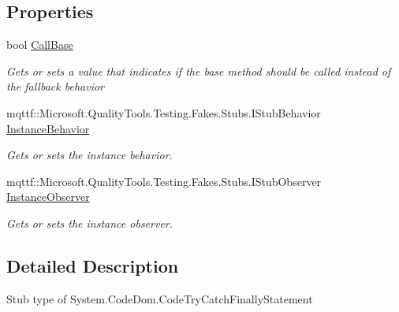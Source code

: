 \subsection*{Properties}
\begin{DoxyCompactItemize}
\item 
bool \hyperlink{class_system_1_1_code_dom_1_1_fakes_1_1_stub_code_try_catch_finally_statement_a00395c1c5a644d6f84ca9e58a2e447ac}{Call\-Base}
\begin{DoxyCompactList}\small\item\em Gets or sets a value that indicates if the base method should be called instead of the fallback behavior\end{DoxyCompactList}\item 
mqttf\-::\-Microsoft.\-Quality\-Tools.\-Testing.\-Fakes.\-Stubs.\-I\-Stub\-Behavior \hyperlink{class_system_1_1_code_dom_1_1_fakes_1_1_stub_code_try_catch_finally_statement_a7ef342185f031815100e43fdbd23acc9}{Instance\-Behavior}
\begin{DoxyCompactList}\small\item\em Gets or sets the instance behavior.\end{DoxyCompactList}\item 
mqttf\-::\-Microsoft.\-Quality\-Tools.\-Testing.\-Fakes.\-Stubs.\-I\-Stub\-Observer \hyperlink{class_system_1_1_code_dom_1_1_fakes_1_1_stub_code_try_catch_finally_statement_a76e5cf96f31fd5a412ba71cbc53fcb2b}{Instance\-Observer}
\begin{DoxyCompactList}\small\item\em Gets or sets the instance observer.\end{DoxyCompactList}\end{DoxyCompactItemize}


\subsection{Detailed Description}
Stub type of System.\-Code\-Dom.\-Code\-Try\-Catch\-Finally\-Statement



